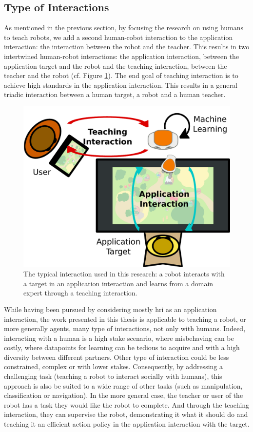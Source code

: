 \subsection{Type of Interactions}

As mentioned in the previous section, by focusing the research on using humans to teach robots, we add a second human-robot interaction to the application interaction: the interaction between the robot and the teacher. This results in two intertwined human-robot interactions: the application interaction, between the application target and the robot and the teaching interaction, between the teacher and the robot (cf. Figure \ref{fig:intro_setup}). The end goal of teaching interaction is to achieve high standards in the application interaction. This results in a general triadic interaction between a human target, a robot and a human teacher. 

\begin{figure}[ht]
	\includegraphics[width=.7\linewidth]{setup.pdf}
	\centering
	\caption{The typical interaction used in this research: a robot interacts with a target in an application interaction and learns from a domain expert through a teaching interaction.}
	\label{fig:intro_setup}
\end{figure}

While having been pursued by considering mostly \gls{hri} as an application interaction, the work presented in this thesis is applicable to teaching a robot, or more generally agents, many type of interactions, not only with humans. Indeed, interacting with a human is a high stake scenario, where misbehaving can be costly, where datapoints for learning can be tedious to acquire and with a high diversity between different partners. Other type of interaction could be less constrained, complex or with lower stakes. Consequently, by addressing a challenging task (teaching a robot to interact socially with humans), this approach is also be suited to a wide range of other tasks (such as manipulation, classification or navigation). In the more general case, the teacher or user of the robot has a task they would like the robot to complete. And through the teaching interaction, they can supervise the robot, demonstrating it what it should do and teaching it an efficient action policy in the application interaction with the target. 

